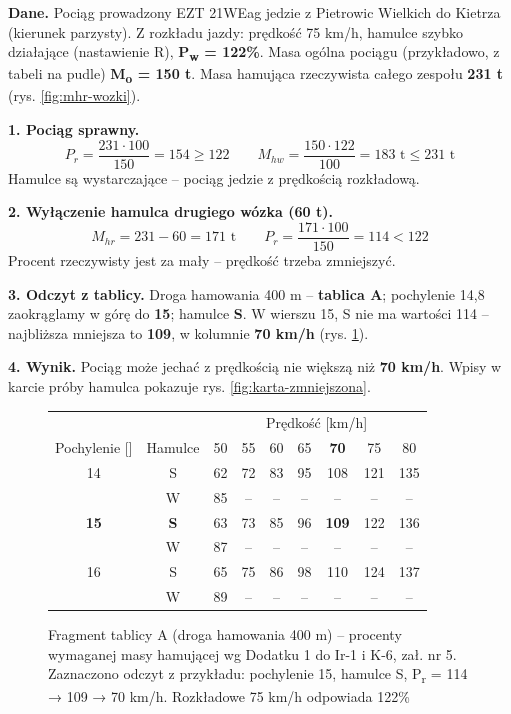 \begin{tcolorbox}[colback=blue!4!white,colframe=blue!60!black,title=Przykład – wyłączony hamulec wózka w 21WEag na linii 194]
	\textbf{Dane.} Pociąg prowadzony EZT 21WEag jedzie z Pietrowic Wielkich do Kietrza (kierunek parzysty). Z rozkładu jazdy: prędkość 75 km/h, hamulce szybko działające (nastawienie R), \textbf{P\textsubscript{w} = 122\%}. Masa ogólna pociągu (przykładowo, z tabeli na pudle) \textbf{M\textsubscript{o} = 150 t}. Masa hamująca rzeczywista całego zespołu \textbf{231 t} (rys. \ref{fig:mhr-wozki}).

	\textbf{1. Pociąg sprawny.}
	\[ P_r = \frac{231 \cdot 100}{150} = 154 \ge 122 \qquad M_{hw} = \frac{150 \cdot 122}{100} = 183 \text{ t} \le 231 \text{ t} \]
	Hamulce są wystarczające – pociąg jedzie z prędkością rozkładową.

	\textbf{2. Wyłączenie hamulca drugiego wózka (60 t).}
	\[ M_{hr} = 231 - 60 = 171 \text{ t} \qquad P_r = \frac{171 \cdot 100}{150} = 114 < 122 \]
	Procent rzeczywisty jest za mały – prędkość trzeba zmniejszyć.

	\textbf{3. Odczyt z tablicy.} Droga hamowania 400 m – \textbf{tablica A}; pochylenie 14,8\textperthousand{} zaokrąglamy w górę do \textbf{15}\textperthousand; hamulce \textbf{S}. W wierszu 15, S nie ma wartości 114 – najbliższa mniejsza to \textbf{109}, w kolumnie \textbf{70 km/h} (rys. \ref{fig:tablica-a-przyklad}).

	\textbf{4. Wynik.} Pociąg może jechać z prędkością nie większą niż \textbf{70 km/h}. Wpisy w karcie próby hamulca pokazuje rys. \ref{fig:karta-zmniejszona}.
\end{tcolorbox}

\begin{figure}
	\centering
	\setlength{\tabcolsep}{4pt}
	\footnotesize
	\begin{tabular}{cc|ccccccc}
		\hline
		\multicolumn{2}{c|}{} & \multicolumn{7}{c}{Prędkość [km/h]} \\
		Pochylenie [\textperthousand] & Hamulce & 50 & 55 & 60 & 65 & \cellcolor{orange!30}\textbf{70} & 75 & 80 \\
		\hline
		14 & S & 62 & 72 & 83 & 95 & 108 & 121 & 135 \\
		 & W & 85 & – & – & – & – & – & – \\
		\hline
		\textbf{15} & \cellcolor{green!15}\textbf{S} & \cellcolor{green!15}63 & \cellcolor{green!15}73 & \cellcolor{green!15}85 & \cellcolor{green!15}96 & \cellcolor{orange!40}\textbf{109} & \cellcolor{green!15}122 & \cellcolor{green!15}136 \\
		 & W & 87 & – & – & – & – & – & – \\
		\hline
		16 & S & 65 & 75 & 86 & 98 & 110 & 124 & 137 \\
		 & W & 89 & – & – & – & – & – & – \\
		\hline
	\end{tabular}
	\caption{Fragment tablicy A (droga hamowania 400 m) – procenty wymaganej masy hamującej wg Dodatku 1 do Ir-1 i K-6, zał. nr 5. Zaznaczono odczyt z przykładu: pochylenie 15\textperthousand, hamulce S, P\textsubscript{r} = 114 → 109 → 70 km/h. Rozkładowe 75 km/h odpowiada 122\%}
	\label{fig:tablica-a-przyklad}
\end{figure}

